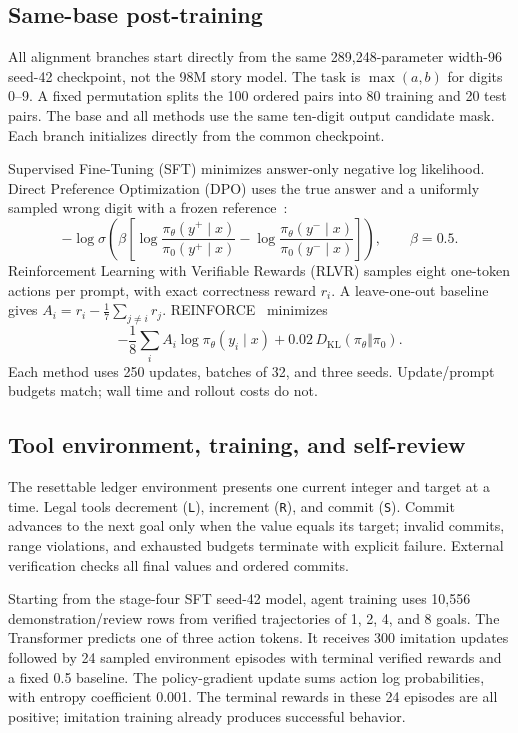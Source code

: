 \documentclass{article}
\begin{document}
\subsection{Same-base post-training}

All alignment branches start directly from the same 289,248-parameter
width-96 seed-42 checkpoint, not the 98M story model. The task is
$\max(a,b)$ for digits 0--9. A fixed permutation splits the 100 ordered
pairs into 80 training and 20 test pairs. The base and all methods use
the same ten-digit output candidate mask. Each branch initializes
directly from the common checkpoint.

Supervised Fine-Tuning (SFT) minimizes answer-only negative log
likelihood. Direct Preference Optimization (DPO) uses the true answer
and a uniformly sampled wrong digit with a frozen reference~\citep{dpo}:
\begin{equation}
 -\log\sigma\left(\beta\left[
 \log\frac{\pi_\theta(y^+\mid x)}{\pi_0(y^+\mid x)}
 -\log\frac{\pi_\theta(y^-\mid x)}{\pi_0(y^-\mid x)}
 \right]\right), \qquad \beta=0.5.
\end{equation}
Reinforcement Learning with Verifiable Rewards (RLVR) samples eight
one-token actions per prompt, with exact correctness reward $r_i$.
A leave-one-out baseline gives
$A_i=r_i-\frac{1}{7}\sum_{j\ne i}r_j$.
REINFORCE~\citep{williams} minimizes
\begin{equation}
 -\frac{1}{8}\sum_i A_i\log\pi_\theta(y_i\mid x)
 +0.02\,D_{\mathrm{KL}}(\pi_\theta\Vert\pi_0).
\end{equation}
Each method uses 250 updates, batches of 32, and three seeds.
Update/prompt budgets match; wall time and rollout costs do not.

\subsection{Tool environment, training, and self-review}

The resettable ledger environment presents one current integer and
target at a time. Legal tools decrement (\texttt{L}), increment
(\texttt{R}), and commit (\texttt{S}). Commit advances to the next goal
only when the value equals its target; invalid commits, range
violations, and exhausted budgets terminate with explicit failure.
External verification checks all final values and ordered commits.

Starting from the stage-four SFT seed-42 model, agent training uses
10,556 demonstration/review rows from verified trajectories of
1, 2, 4, and 8 goals. The Transformer predicts one of three action tokens.
It receives 300 imitation updates followed by 24 sampled environment
episodes with terminal verified rewards and a fixed 0.5 baseline.
The policy-gradient update sums action log probabilities, with
entropy coefficient 0.001. The terminal rewards in these 24 episodes
are all positive; imitation training already produces successful behavior.
\end{document}
